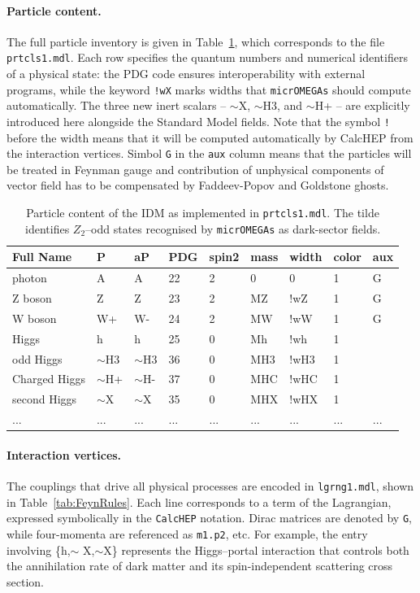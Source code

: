 \documentclass[12pt,a4paper]{article}
\begin{document}
\paragraph{Particle content.}
The full particle inventory is given in Table~\ref{tab:particles}, which corresponds to the file \texttt{prtcls1.mdl}.  
Each row specifies the quantum numbers and numerical identifiers of a physical state: the PDG code ensures interoperability with external programs, while the keyword \texttt{!wX} marks widths that \texttt{micrOMEGAs} should compute automatically.  
The three new inert scalars -- $\sim$X,  $\sim$H3, and $\sim$H+ -- are explicitly introduced here alongside the Standard Model fields. 
Note that the symbol \verb|!| before the width means that it will be computed automatically by CalcHEP from the interaction vertices.
Simbol {\tt G} in the {\tt aux} column means that the particles will be treated in Feynman gauge and contribution of   unphysical components of vector field has to be compensated  by Faddeev-Popov and Goldstone ghosts.

\begin{table}[htbp]
\centering
{\small
\begin{tabular}{l|l|l|l|l|l|l|l|l}
Full Name & P & aP & PDG & spin2 & mass & width & color & aux \\
\hline
photon & A & A & 22 & 2 & 0 & 0 & 1 & G \\
Z boson & Z & Z & 23 & 2 & MZ & !wZ & 1 & G \\
W boson & W+ & W- & 24 & 2 & MW & !wW & 1 & G \\
Higgs & h & h & 25 & 0 & Mh & !wh & 1 &  \\
odd Higgs & $\sim$H3 & $\sim$H3 & 36 & 0 & MH3 & !wH3 & 1 &  \\
Charged Higgs & $\sim$H+ & $\sim$H- & 37 & 0 & MHC & !wHC & 1 &  \\
second Higgs & $\sim$X & $\sim$X & 35 & 0 & MHX & !wHX & 1 &  \\
... & ... & ... & ... & ... & ... & ... & ... & ...
\end{tabular}
}
\caption{Particle content of the IDM as implemented in \texttt{prtcls1.mdl}.  The tilde identifies $Z_2$–odd states recognised by \texttt{micrOMEGAs} as dark-sector fields.}
\label{tab:particles}
\end{table}


\paragraph{Interaction vertices.}
The couplings that drive all physical processes are encoded in \texttt{lgrng1.mdl}, shown in Table~\ref{tab:FeynRules}.  
Each line corresponds to a term of the Lagrangian, expressed symbolically in the \texttt{CalcHEP} notation.  
Dirac matrices are denoted by \texttt{G}, while four-momenta are referenced as \texttt{m1.p2}, etc.  
For example, the entry involving \{h,$\sim$ X,$\sim$X\} represents the Higgs--portal interaction that controls both the annihilation rate of dark matter and its spin-independent scattering cross section.
\end{document}
